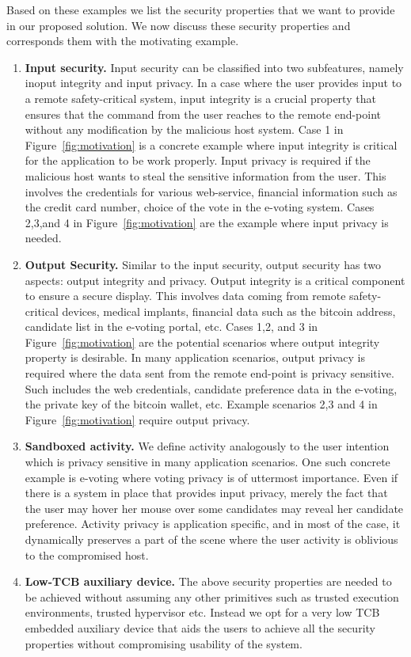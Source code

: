  Based on these examples we list the security properties that we want to provide in our proposed solution. We now discuss these security properties and corresponds them with the motivating example.

\begin{enumerate}
  \item \textbf{Input security.} Input security can be classified into two subfeatures, namely inoput integrity and input privacy. In a case where the user provides input to a remote safety-critical system, input integrity is a crucial property that ensures that the command from the user reaches to the remote end-point without any modification by the malicious host system. Case 1 in Figure~\ref{fig:motivation} is a concrete example where input integrity is critical for the application to be work properly. Input privacy is required if the malicious host wants to steal the sensitive information from the user. This involves the credentials for various web-service, financial information such as the credit card number, choice of the vote in the e-voting system. Cases 2,3,and 4 in Figure~\ref{fig:motivation} are the example where input privacy is needed.
  \item \textbf{Output Security.} Similar to the input security, output security has two aspects: output integrity and privacy. Output integrity is a critical component to ensure a secure display. This involves data coming from remote safety-critical devices, medical implants, financial data such as the bitcoin address, candidate list in the e-voting portal, etc. Cases 1,2, and 3 in Figure~\ref{fig:motivation} are the potential scenarios where output integrity property is desirable. In many application scenarios, output privacy is required where the data sent from the remote end-point is privacy sensitive. Such includes the web credentials, candidate preference data in the e-voting, the private key of the bitcoin wallet, etc. Example scenarios 2,3 and 4 in Figure~\ref{fig:motivation} require output privacy.
  \item \textbf{Sandboxed activity.} We define activity analogously to the user intention which is privacy sensitive in many application scenarios. One such concrete example is e-voting where voting privacy is of uttermost importance. Even if there is a system in place that provides input privacy, merely the fact that the user may hover her mouse over some candidates may reveal her candidate preference. Activity privacy is application specific, and in most of the case, it dynamically preserves a part of the scene where the user activity is oblivious to the compromised host. 
  \item\textbf{Low-TCB auxiliary device.} The above security properties are needed to be achieved without assuming any other primitives such as trusted execution environments, trusted hypervisor etc. Instead we opt for a very low TCB embedded auxiliary device that aids the users to achieve all the security properties without compromising usability of the system. 
\end{enumerate}

